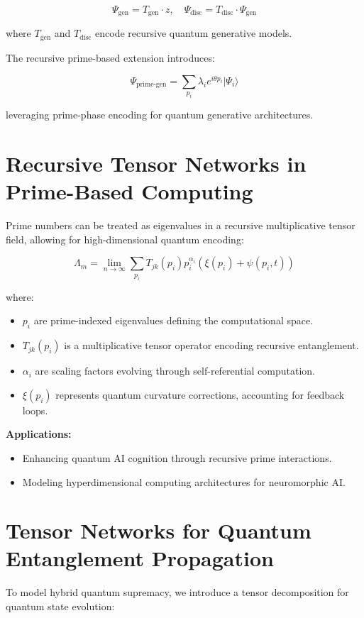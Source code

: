 \documentclass{article}
\theoremstyle{plain}
\begin{document}
\begin{equation}
\Psi_{\text{gen}} = T_{\text{gen}} \cdot z, \quad \Psi_{\text{disc}} = T_{\text{disc}} \cdot \Psi_{\text{gen}}
\end{equation}

where \(T_{\text{gen}}\) and \(T_{\text{disc}}\) encode recursive quantum generative models.

The recursive prime-based extension introduces:

\begin{equation}
\Psi_{\text{prime-gen}} = \sum_{p_i} \lambda_i e^{i \theta p_i} |\Psi_i\rangle
\end{equation}

leveraging prime-phase encoding for quantum generative architectures.

\section{Recursive Tensor Networks in Prime-Based Computing}
Prime numbers can be treated as eigenvalues in a recursive multiplicative tensor field, allowing for high-dimensional quantum encoding:

\begin{equation}
\Lambda_m = \lim_{n\to\infty} \sum_{p_i} T_{jk}(p_i) p_i^{\alpha_i} (\xi(p_i) + \psi(p_i, t))
\end{equation}

where:
\begin{itemize}
    \item \( p_i \) are prime-indexed eigenvalues defining the computational space.
    \item \( T_{jk}(p_i) \) is a multiplicative tensor operator encoding recursive entanglement.
    \item \( \alpha_i \) are scaling factors evolving through self-referential computation.
    \item \( \xi(p_i) \) represents quantum curvature corrections, accounting for feedback loops.
\end{itemize}

\textbf{Applications:}
\begin{itemize}
    \item Enhancing quantum AI cognition through recursive prime interactions.
    \item Modeling hyperdimensional computing architectures for neuromorphic AI.
\end{itemize}

\section{Tensor Networks for Quantum Entanglement Propagation}
To model hybrid quantum supremacy, we introduce a tensor decomposition for quantum state evolution:
\end{document}
